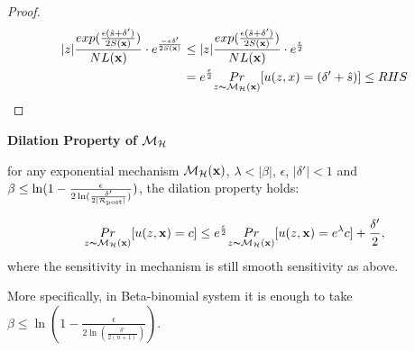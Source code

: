 \documentclass{article}
\begin{document}
\begin{proof}
		\begin{equation*}
		\begin{split}
		|z|  \frac{exp(\frac{\epsilon (\hat{s} + \delta')}{2 S(\textbf{x})})}{NL(\textbf{x})} \cdot e^{\frac{- \epsilon \delta'}{2 S(\textbf{x})}}
		&  \leq |z| \frac{exp(\frac{\epsilon (\hat{s} + \delta')}{2 S(\textbf{x})})}{NL(\textbf{x})} \cdot e^{\frac{\epsilon}{2}}\\
		&  =  e^{\frac{\epsilon}{2}} \underset{z \thicksim \mathcal{M}_{\mathcal{H}}(\textbf{x})}{Pr}[u(z,x) = (\delta' + \hat{s})] \leq RHS\\
		\end{split}
		\end{equation*}

\end{proof}



\noindent \textbf{Dilation Property of $\mathcal{M}_{\mathcal{H}}$}
\begin{lem}
\label{lem_dilation}
for any exponential mechanism $\mathcal{M}_{\mathcal{H}}(\textbf{x})$, $\lambda < |\beta|$, $\epsilon$, $|\delta'| < 1$ and $\beta \leq \ln(1 - \frac{\epsilon}{2 \ln (\frac{\delta'}{2 |\mathcal{R}_{\textup{post}}|})})$, the dilation property holds:

\begin{equation*}
\underset{z \thicksim \mathcal{M}_{\mathcal{H}}(\textbf{x})}{Pr}[u(z,\textbf{x}) = c]
\leq
e^{\frac{\epsilon}{2}} \underset{z \thicksim \mathcal{M}_{\mathcal{H}}(\textbf{x})}{Pr}[u(z,\textbf{x}) = e^{\lambda} c] + \frac{\delta'}{2},
\end{equation*}
where the sensitivity in mechanism is still smooth sensitivity as above.

More specifically, in Beta-binomial system it is enough to take $\beta \leq \ln(1 - \frac{\epsilon}{2 \ln (\frac{\delta'}{2 (n + 1)})})$.
\end{lem}
\end{document}
